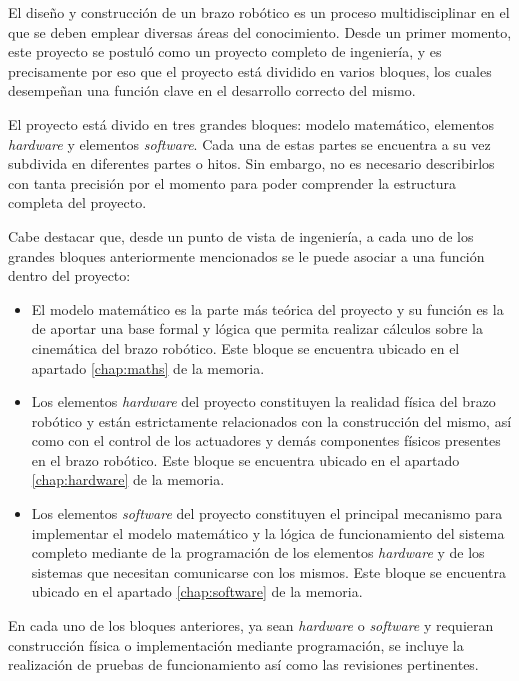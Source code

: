 El diseño y construcción de un brazo robótico es un proceso multidisciplinar en el que se deben emplear diversas áreas del conocimiento. Desde un primer momento, este proyecto se postuló como un proyecto completo de ingeniería, y es precisamente por eso que el proyecto está dividido en varios bloques, los cuales desempeñan una función clave en el desarrollo correcto del mismo.

El proyecto está divido en tres grandes bloques: modelo matemático, elementos \textit{hardware} y elementos \textit{software}. Cada una de estas partes se encuentra a su vez subdivida en diferentes partes o hitos. Sin embargo, no es necesario describirlos con tanta precisión por el momento para poder comprender la estructura completa del proyecto.

Cabe destacar que, desde un punto de vista de ingeniería, a cada uno de los grandes bloques anteriormente mencionados se le puede asociar a una función dentro del proyecto:

\begin{itemize}
    \item El modelo matemático es la parte más teórica del proyecto y su función es la de aportar una base formal y lógica que permita realizar cálculos sobre la cinemática del brazo robótico. Este bloque se encuentra ubicado en el apartado \ref{chap:maths} de la memoria.
    
    \item Los elementos \textit{hardware} del proyecto constituyen la realidad física del brazo robótico y están estrictamente relacionados con la construcción del mismo, así como con el control de los actuadores y demás componentes físicos presentes en el brazo robótico. Este bloque se encuentra ubicado en el apartado \ref{chap:hardware} de la memoria.
    
    \item Los elementos \textit{software} del proyecto constituyen el principal mecanismo para implementar el modelo matemático y la lógica de funcionamiento del sistema completo mediante de la programación de los elementos \textit{hardware} y de los sistemas que necesitan comunicarse con los mismos. Este bloque se encuentra ubicado en el apartado \ref{chap:software} de la memoria.
\end{itemize}

En cada uno de los bloques anteriores, ya sean \textit{hardware} o \textit{software} y requieran construcción física o implementación mediante programación, se incluye la realización de pruebas de funcionamiento así como las revisiones pertinentes.

